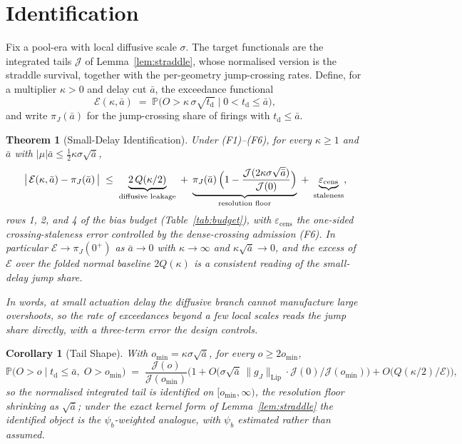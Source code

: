 \documentclass[11pt,a4paper]{article}
\theoremstyle{definition}
\theoremstyle{plain}
\newtheorem{theorem}{Theorem}
\newtheorem{corollary}{Corollary}
\theoremstyle{remark}
\newcommand{\surv}{Q}
\newcommand{\jtail}{\mathcal{J}}
\newcommand{\tact}{t_{\mathrm{d}}}
\begin{document}
\section{Identification}\label{sec:ident}

Fix a pool-era with local diffusive scale $\sigma$. The target functionals are the integrated tails $\jtail$ of Lemma~\ref{lem:straddle}, whose normalised version is the straddle
survival, together with the per-geometry jump-crossing rates. Define, for a multiplier $\kappa > 0$ and delay cut $\bar a$, the exceedance functional
\[
\mathcal{E}(\kappa, \bar a) \;=\; \mathbb{P}\big(O > \kappa\,
\sigma \sqrt{\tact}\;\big|\; 0 < \tact \le \bar a\big),
\]
and write $\pi_J(\bar a)$ for the jump-crossing share of firings with $\tact \le \bar a$.

\begin{theorem}[Small-Delay Identification]\label{thm:smalldelay}
Under (F1)--(F6), for every $\kappa \ge 1$ and $\bar a$ with
$|\mu| \bar a \le \tfrac12 \kappa\sigma\sqrt{\bar a}$,
\[
\big|\, \mathcal{E}(\kappa, \bar a) - \pi_J(\bar a)\, \big| \;\le\;
\underbrace{2\,\surv(\kappa/2)}_{\textnormal{diffusive leakage}}
\;+\; \underbrace{\pi_J(\bar a)\,
\Big(1 - \frac{\jtail(2\kappa\sigma\sqrt{\bar a})}{\jtail(0)}\Big)
}_{\textnormal{resolution floor}}
\;+\; \underbrace{\varepsilon_{\mathrm{cens}}}_{\textnormal{staleness}},
\]
rows 1, 2, and 4 of the bias budget (Table~\ref{tab:budget}), with $\varepsilon_{\mathrm{cens}}$ the one-sided crossing-staleness error controlled by the dense-crossing admission (F6). In particular
$\mathcal{E} \to \pi_J(0^+)$ as $\bar a \to 0$ with $\kappa \to
\infty$ and $\kappa\sqrt{\bar a} \to 0$, and the excess of $\mathcal{E}$ over the folded normal baseline $2\surv(\kappa)$ is a consistent reading of the small-delay jump share.
\end{theorem}

\emph{In words, at small actuation delay the diffusive branch cannot manufacture large overshoots, so the rate of exceedances beyond a few local scales reads the jump share directly, with a three-term
error the design controls.}

\begin{corollary}[Tail Shape]\label{cor:tailshape}
With $o_{\min} = \kappa\sigma\sqrt{\bar a}$, for every $o \ge 2
o_{\min}$,
\[
\mathbb{P}\big(O > o \;\big|\; \tact \le \bar a,\; O > o_{\min}\big)
\;=\; \frac{\jtail(o)}{\jtail(o_{\min})}
\Big(1 + O\big(\sigma\sqrt{\bar a}\,
\|g_J\|_{\mathrm{Lip}} \cdot \jtail(0)/\jtail(o_{\min})\big)
+ O\big(\surv(\kappa/2)/\mathcal{E}\big)\Big),
\]
so the normalised integrated tail is identified on $[o_{\min},
\infty)$, the resolution floor shrinking as $\sqrt{\bar a}$; under the exact kernel form of Lemma~\ref{lem:straddle} the identified object is the $\psi_b$-weighted analogue, with $\psi_b$ estimated
rather than assumed.
\end{corollary}
\end{document}
